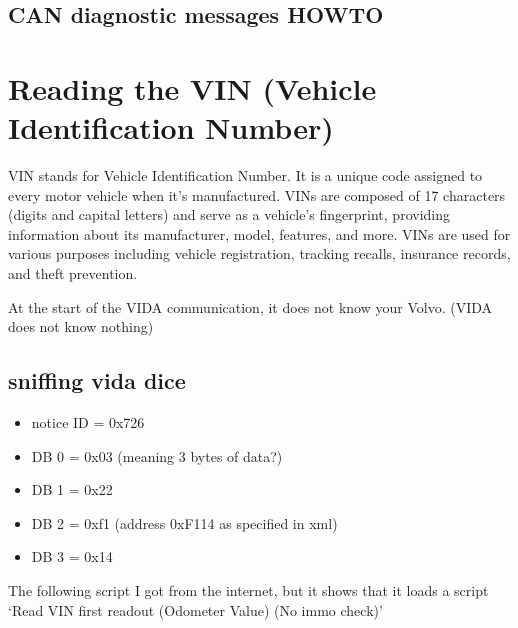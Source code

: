 \documentclass[letterpaper,10pt,english]{sphinxmanual}
\begin{document}
\section{CAN diagnostic messages HOWTO}
\label{\detokenize{decoding:can-diagnostic-messages-howto}}

\chapter{Reading the VIN (Vehicle Identification Number)}
\label{\detokenize{vin:reading-the-vin-vehicle-identification-number}}\label{\detokenize{vin::doc}}
\sphinxAtStartPar
VIN stands for Vehicle Identification Number. It is a unique code assigned to every motor vehicle when it’s manufactured. VINs are composed of 17 characters (digits and capital letters) and serve as a vehicle’s fingerprint, providing information about its manufacturer, model, features, and more. VINs are used for various purposes including vehicle registration, tracking recalls, insurance records, and theft prevention.

\sphinxAtStartPar
At the start of the VIDA communication, it does not know your Volvo. (VIDA does not know nothing)


\section{sniffing vida dice}
\label{\detokenize{vin:sniffing-vida-dice}}\begin{itemize}
\item {} 
\sphinxAtStartPar
notice ID = 0x726

\item {} 
\sphinxAtStartPar
DB 0 = 0x03 (meaning 3 bytes of data?)

\item {} 
\sphinxAtStartPar
DB 1 = 0x22

\item {} 
\sphinxAtStartPar
DB 2 = 0xf1 (address 0xF114 as specified in xml)

\item {} 
\sphinxAtStartPar
DB 3 = 0x14

\end{itemize}

\noindent{}

\sphinxAtStartPar
The following script I got from the internet, but it shows  that it loads a script ‘Read VIN first readout (Odometer Value) (No immo check)’
\end{document}
